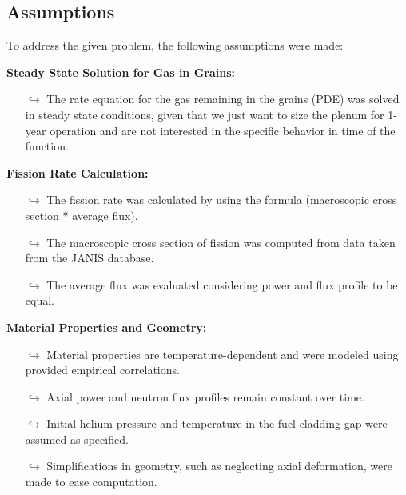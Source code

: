 \subsection{Assumptions}
To address the given problem, the following assumptions were made:

\textbf{Steady State Solution for Gas in Grains:}

\begin{itemize}
\item[$\hookrightarrow$] The rate equation for the gas remaining in the grains (PDE) was solved in steady state conditions, given that we just want to size the plenum for 1-year operation and are not interested in the specific behavior in time of the function.
\end{itemize}

\textbf{Fission Rate Calculation:}

\begin{itemize}
\item[$\hookrightarrow$] The fission rate was calculated by using the formula (macroscopic cross section * average flux).
\item[$\hookrightarrow$] The macroscopic cross section of fission was computed from data taken from the JANIS database.
\item[$\hookrightarrow$] The average flux was evaluated considering power and flux profile to be equal.
\end{itemize}

\textbf{Material Properties and Geometry:}

\begin{itemize}
\item[$\hookrightarrow$] Material properties are temperature-dependent and were modeled using provided empirical correlations.
\item[$\hookrightarrow$] Axial power and neutron flux profiles remain constant over time.
\item[$\hookrightarrow$] Initial helium pressure and temperature in the fuel-cladding gap were assumed as specified.
\item[$\hookrightarrow$] Simplifications in geometry, such as neglecting axial deformation, were made to ease computation.
\end{itemize}
